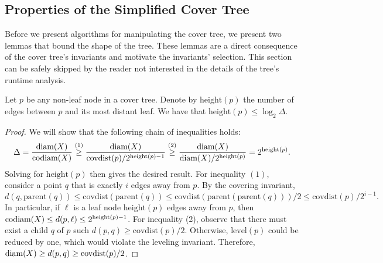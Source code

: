 \documentclass[../main.tex]{subfiles}
\newcommand{\dist}[2]{\distf({#1},{#2})}
\newcommand{\distf}{d}
\newcommand{\diam}[1]{\textnormal{diam}({#1})}
\newcommand{\codiam}[1]{\textnormal{codiam}({#1})}
\newcommand{\aspect}[1]{\Delta}
\newcommand{\mkfunction}[1]{\ensuremath{\text{{#1}}}}
\newcommand{\level}[1]      {\mkfunction{level}({#1})}
\newcommand{\parent}[1]     {\mkfunction{parent}({#1})}
\newcommand{\covdist}[1]    {\mkfunction{covdist}({#1})}
\newcommand{\maxdist}[1]    {\mkfunction{maxdist}({#1})}
\newcommand{\height}[1]     {\mkfunction{height}({#1})}
\begin{document}

\subsection{Properties of the Simplified Cover Tree}

Before we present algorithms for manipulating the cover tree, 
we present two lemmas that bound the shape of the tree.
These lemmas are a direct consequence of the cover tree's invariants and motivate the invariants' selection.
This section can be safely skipped by the reader not interested in the details of the tree's runtime analysis.


%


\begin{lemma}
    \label{lemma:height}
    Let $p$ be any non-leaf node in a cover tree.
    Denote by $\height{p}$ the number of edges between $p$ and its most distant leaf.
    We have that $\height{p} \le \log_2\aspect{X}$.
\end{lemma}

\begin{proof}
    We will show that the following chain of inequalities holds:
    \begin{equation}
        \aspect{X} 
        = \frac{\diam{X}}{\codiam{X}} 
        \overset{(1)}\ge \frac{\diam{X}}{\covdist{p}/2^{\height p-1}} 
        \overset{(2)}\ge \frac{\diam{X}}{\diam{X}/2^{\height p}} 
        = 2^{\height p}
        .
    \end{equation}
    Solving for $\height p$ then gives the desired result.
    For inequality $(1)$, consider a point $q$ that is exactly $i$ edges away from $p$.
    By the covering invariant, 
    \begin{equation}
        \dist{q}{\parent{q}} 
        \le 
        \covdist{\parent{q}}
        \le 
        \covdist{\parent{\parent{q}}}/2
        \le
        \covdist{p}/2^{i-1}
        .
    \end{equation}
    In particular, if $\ell$ is a leaf node $\height p$ edges away from $p$,
    then $\codiam{X}\le\dist{p}{\ell}\le2^{\height p-1}$.
    For inequality (2), observe that there must exist a child $q$ of $p$ such $\dist{p}{q} \ge \covdist{p}/2$.
    Otherwise, $\level p$ could be reduced by one, which would violate the leveling invariant.
    Therefore, $\diam{X} \ge \dist{p}{q} \ge \covdist{p}/2$.
\end{proof}
\end{document}
